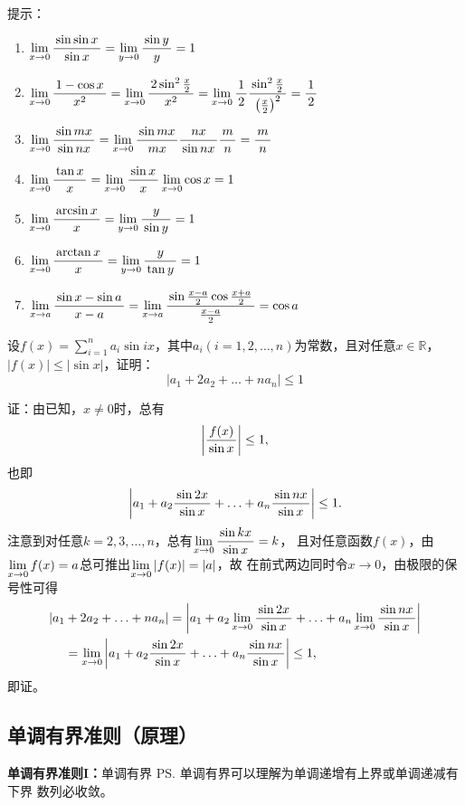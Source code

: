 \ifhint
提示：
\begin{enumerate}[(1)]
	\setlength{\itemindent}{1cm}
	\item $\limx{0}\df{\sin\sin x}{\sin x}
	=\lim\limits_{y\to0}\df{\sin y}y=1$ 
	\item $\limx 0\df{1-\cos x}{x^2}
	=\limx 0\df{2\sin^2\frac x2}{x^2}
	=\limx 0\df12\df{\sin^2\frac x2}
	{\left(\frac x2\right)^2}=\df12$ 
	\item $\limx 0\df{\sin mx}{\sin nx}
	=\limx 0\df{\sin mx}{mx}\df{nx}{\sin nx}\df mn=\df mn$
	\item $\limx 0\df{\tan x}{x}
	=\limx 0\df{\sin x}{x}\limx0\cos x=1$
	\item $\limx 0\df{\arcsin x}x
	=\lim\limits_{y\to0}\df{y}{\sin y}=1$
	\item $\limx 0\df{\arctan x}x
	=\lim\limits_{y\to0}\df{y}{\tan y}=1$
	\item $\limx a\df{\sin x-\sin a}{x-a}
	=\limx a\df{\sin\frac{x-a}2\cos\frac{x+a}2}{\frac{x-a}2}=\cos a$
\end{enumerate}
\fi

\bs

\egz 设$f(x)=\sum\limits_{i=1}^na_i\sin
ix$，其中$a_i(i=1,2,\ldots,n)$为常数，且对任意$x\in\mathbb{R}$， $|f(x)|\leq |\sin x|$，证明：
$$\left|a_1+2a_2+\ldots+na_n\right|\leq 1$$

证：由已知，$x\ne 0$时，总有
$$\left|\df{f(x)}{\sin x}\right|\leq 1,$$
也即
$$\left|a_1+a_2\df{\sin 2x}{\sin x}+\ldots
+a_n\df{\sin nx}{\sin x}\right|\leq 1.$$
注意到对任意$k=2,3,\ldots,n$，总有$\limx{0}\df{\sin kx}{\sin x}=k$，
且对任意函数$f(x)$，由$\limx{0}f(x)=a$总可推出$\limx{0}|f(x)|=|a|$，故
在前式两边同时令$x\to0$，由极限的保号性可得
\begin{align*}
	|a_1&+2a_2+\ldots+na_n|
	=\left|a_1+a_2\limx0\df{\sin 2x}{\sin x}+\ldots
	+a_n\limx0\df{\sin nx}{\sin x}\right|\\
	&=\limx0\left|a_1+a_2\df{\sin 2x}{\sin x}+\ldots
	+a_n\df{\sin nx}{\sin x}\right|\leq 1,
\end{align*}
即证。\fin

\subsection{单调有界准则（原理）}

\begin{thx}
	{\bf 单调有界准则I：}单调有界
	\ps{单调有界可以理解为单调递增有上界或单调递减有下界}
	数列必收敛。
\end{thx}

